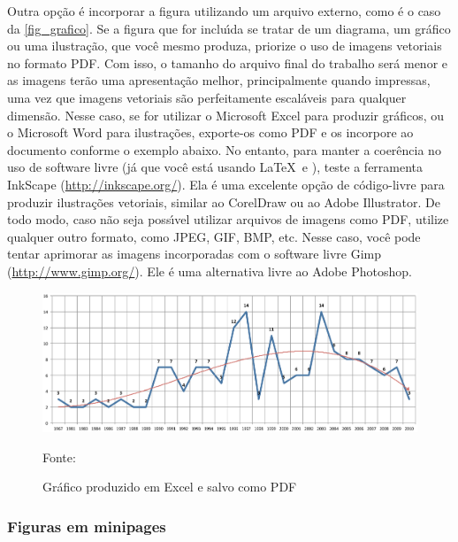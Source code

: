 Outra op\c{c}\~ao \'e incorporar a figura utilizando um arquivo externo, como \'e o caso da \autoref{fig_grafico}. Se a figura que for inclu\'{\i}da se tratar de um diagrama, um gr\'afico ou uma ilustra\c{c}\~ao, que voc\^e mesmo produza, priorize o uso de imagens vetoriais no formato PDF. Com isso, o tamanho do arquivo final do trabalho ser\'a menor e as imagens ter\~ao uma apresenta\c{c}\~ao melhor, principalmente quando impressas, uma vez que imagens vetoriais s\~ao perfeitamente escal\'aveis para qualquer dimens\~ao. Nesse caso, se for utilizar o Microsoft Excel para produzir gr\'aficos, ou o Microsoft Word para ilustra\c{c}\~oes, exporte-os como PDF e os incorpore ao documento conforme o exemplo abaixo. No entanto, para manter a
coer\^encia no uso de software livre (j\'a que voc\^e est\'a usando \LaTeX\  e \abnTeX),
teste a ferramenta \textsf{InkScape}
(\url{http://inkscape.org/}). Ela \'e uma excelente op\c{c}\~ao de c\'odigo-livre para
produzir ilustra\c{c}\~oes vetoriais, similar ao CorelDraw ou ao Adobe
Illustrator. De todo modo, caso n\~ao seja poss\'{\i}vel
utilizar arquivos de imagens como PDF, utilize qualquer outro formato, como
JPEG, GIF, BMP, etc. Nesse caso, voc\^e pode tentar aprimorar as imagens
incorporadas com o software livre \textsf{Gimp}
(\url{http://www.gimp.org/}). Ele \'e uma alternativa livre ao Adobe
Photoshop. \\

\begin{figure}[H]
	\caption{\label{fig_grafico}Gr\'afico produzido em Excel e salvo como PDF}
	\includegraphics[scale=0.5]{USPSC-img/USPSC-modelo-img-grafico.pdf}
	\begin{flushleft}
		Fonte: 
	\end{flushleft}	
\end{figure}

\subsubsection{Figuras em minipages}

